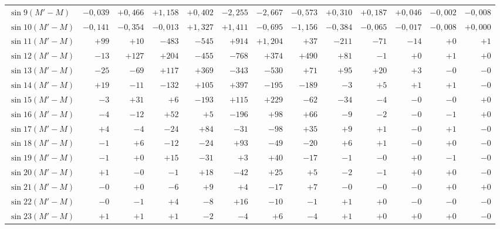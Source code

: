 \begin{landscape}
\begin{longtable}{@{}l|r|r|r|r|r|r|r|r|r|r|r|r@{}}
\(\sin 9(M'-M)\) & \(-0{,}039\) & \(+0{,}466\) & \(+1{,}158\) & \(+0{,}402\) & \(-2{,}255\) & \(-2{,}667\) & \(-0{,}573\) & \(+0{,}310\) & \(+0{,}187\) & \(+0{,}046\) & \(-0{,}002\) & \(-0{,}008\)\\
\(\sin 10(M'-M)\) & \(-0{,}141\) & \(-0{,}354\) & \(-0{,}013\) & \(+1{,}327\) & \(+1{,}411\) & \(-0{,}695\) & \(-1{,}156\) & \(-0{,}384\) & \(-0{,}065\) & \(-0{,}017\) & \(-0{,}008\) & \(+0{,}000\)\\
\(\sin 11(M'-M)\) & \(+99\) & \(+10\) & \(-483\) & \(-545\) & \(+914\) & \(+1{,}204\) & \(+37\) & \(-211\) & \(-71\) & \(-14\) & \(+0\) & \(+1\)\\
\(\sin 12(M'-M)\) & \(-13\) & \(+127\) & \(+204\) & \(-455\) & \(-768\) & \(+374\) & \(+490\) & \(+81\) & \(-1\) & \(+0\) & \(+1\) & \(+0\)\\
\(\sin 13(M'-M)\) & \(-25\) & \(-69\) & \(+117\) & \(+369\) & \(-343\) & \(-530\) & \(+71\) & \(+95\) & \(+20\) & \(+3\) & \(-0\) & \(-0\)\\
\(\sin 14(M'-M)\) & \(+19\) & \(-11\) & \(-132\) & \(+105\) & \(+397\) & \(-195\) & \(-189\) & \(-3\) & \(+5\) & \(+1\) & \(+1\) & \(-0\)\\
\(\sin 15(M'-M)\) & \(-3\) & \(+31\) & \(+6\) & \(-193\) & \(+115\) & \(+229\) & \(-62\) & \(-34\) & \(-4\) & \(-0\) & \(-0\) & \(+0\)\\
\(\sin 16(M'-M)\) & \(-4\) & \(-12\) & \(+52\) & \(+5\) & \(-196\) & \(+98\) & \(+66\) & \(-9\) & \(-2\) & \(-0\) & \(-1\) & \(+0\)\\
\(\sin 17(M'-M)\) & \(+4\) & \(-4\) & \(-24\) & \(+84\) & \(-31\) & \(-98\) & \(+35\) & \(+9\) & \(+1\) & \(-0\) & \(+1\) & \(-0\)\\
\(\sin 18(M'-M)\) & \(-1\) & \(+6\) & \(-12\) & \(-24\) & \(+93\) & \(-49\) & \(-20\) & \(+6\) & \(+1\) & \(-0\) & \(+0\) & \(-0\)\\
\(\sin 19(M'-M)\) & \(-1\) & \(+0\) & \(+15\) & \(-31\) & \(+3\) & \(+40\) & \(-17\) & \(-1\) & \(-0\) & \(+0\) & \(-1\) & \(-0\)\\
\(\sin 20(M'-M)\) & \(+1\) & \(-0\) & \(-1\) & \(+18\) & \(-42\) & \(+25\) & \(+5\) & \(-2\) & \(-1\) & \(+0\) & \(+0\) & \(-0\)\\
\(\sin 21(M'-M)\) & \(-0\) & \(+0\) & \(-6\) & \(+9\) & \(+4\) & \(-17\) & \(+7\) & \(-0\) & \(-0\) & \(-0\) & \(+0\) & \(+0\)\\
\(\sin 22(M'-M)\) & \(-0\) & \(-1\) & \(+4\) & \(-8\) & \(+16\) & \(-10\) & \(-1\) & \(+1\) & \(+0\) & \(-0\) & \(-0\) & \(-0\)\\
\(\sin 23(M'-M)\) & \(+1\) & \(+1\) & \(+1\) & \(-2\) & \(-4\) & \(+6\) & \(-4\) & \(+1\) & \(+0\) & \(+0\) & \(+0\) & \(-0\)\\

\end{longtable}
\end{landscape}
